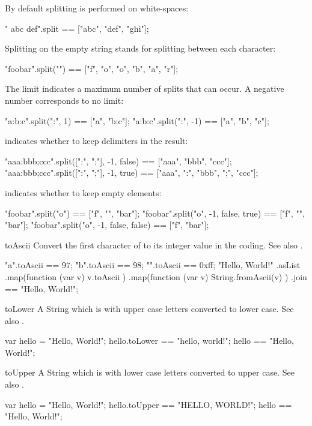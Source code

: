 \begin{urbiscriptapi}
\noindent
By default splitting is performed on white-spaces:

\begin{urbiassert}
"  abc  def\tghi\n".split == ["abc", "def", "ghi"];
\end{urbiassert}

\noindent
Splitting on the empty string stands for splitting between each character:

\begin{urbiassert}
"foobar".split("") == ["f", "o", "o", "b", "a", "r"];
\end{urbiassert}

The limit  indicates a maximum number of splits that can occur. A
negative number corresponds to no limit:

\begin{urbiassert}
"a:b:c".split(":",  1) == ["a", "b:c"];
"a:b:c".split(":", -1) == ["a", "b", "c"];
\end{urbiassert}

 indicates whether to keep delimiters in the result:

\begin{urbiassert}
"aaa:bbb;ccc".split([":", ";"], -1, false) == ["aaa",      "bbb",      "ccc"];
"aaa:bbb;ccc".split([":", ";"], -1, true)  == ["aaa", ":", "bbb", ";", "ccc"];
\end{urbiassert}

 indicates whether to keep empty elements:

\begin{urbiassert}
"foobar".split("o")                   == ["f", "", "bar"];
"foobar".split("o", -1, false, true)  == ["f", "", "bar"];
"foobar".split("o", -1, false, false) == ["f",     "bar"];
\end{urbiassert}


\item[toAscii] Convert the first character of \this to its integer value in
  the  coding.  See also .
\begin{urbiassert}
   "a".toAscii == 97;
   "b".toAscii == 98;
"\xff".toAscii == 0xff;
"Hello, World!\n"
  .asList
  .map(function (var v) { v.toAscii })
  .map(function (var v) { String.fromAscii(v) })
  .join
  == "Hello, World!\n";
\end{urbiassert}


\item[toLower]%
  A String which is \this with upper case letters converted to lower case.
  See also .
\begin{urbiassert}
    var hello =  "Hello, World!";
hello.toLower == "hello, world!";
        hello == "Hello, World!";
\end{urbiassert}


\item[toUpper]
  A String which is \this with lower case letters converted to upper case.
  See also .
\begin{urbiassert}
    var hello =  "Hello, World!";
hello.toUpper == "HELLO, WORLD!";
        hello == "Hello, World!";
\end{urbiassert}
\end{urbiscriptapi}

